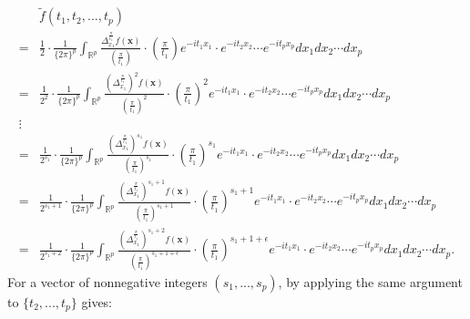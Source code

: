 \documentclass[11pt]{article}
\numberwithin{equation}{section}
\begin{document}
\begin{align*}
	&\widetilde{f}(t_1,t_2,...,t_p)\\
	=&\frac{1}{2}\cdot\frac{1}{\{2\pi\}^{p}}\int_{\mathbb{R}^p}\frac{\Delta_{x_1}^{\frac{\pi}{t_1}}f\left(\boldsymbol{x}\right)}{\left(\frac{\pi}{t_1}\right)}\cdot \left(\frac{\pi}{t_1}\right) e^{-it_1x_1}\cdot e^{-it_2x_2}\cdots e^{-it_px_p}dx_1dx_2\cdots dx_p\\
	=&\frac{1}{2^2}\cdot\frac{1}{\{2\pi\}^{p}}\int_{\mathbb{R}^p}\frac{\left(\Delta_{x_1}^{\frac{\pi}{t_1}}\right)^2f(\boldsymbol{x})}{\left(\frac{\pi}{t_1}\right)^2} \cdot \left(\frac{\pi}{t_1}\right)^2 e^{-it_1x_1}\cdot e^{-it_2x_2}\cdots e^{-it_px_p}dx_1dx_2\cdots dx_p\\
	\vdots &\\
	=&\frac{1}{2^{s_1}}\cdot\frac{1}{\{2\pi\}^{p}}\int_{\mathbb{R}^p}\frac{\left(\Delta_{x_1}^{\frac{\pi}{t_1}}\right)^{s_1}f(\boldsymbol{x})}{\left(\frac{\pi}{t_1}\right)^{s_1}} \cdot \left(\frac{\pi}{t_1}\right)^{s_1} e^{-it_1x_1}\cdot e^{-it_2x_2}\cdots e^{-it_px_p}dx_1dx_2\cdots dx_p\\
		=&\frac{1}{2^{s_1+1}}\cdot\frac{1}{\{2\pi\}^{p}}\int_{\mathbb{R}^p}\frac{\left(\Delta_{x_1}^{\frac{\pi}{t_1}}\right)^{s_1+1}f(\boldsymbol{x})}{\left(\frac{\pi}{t_1}\right)^{s_1+1}} \cdot \left(\frac{\pi}{t_1}\right)^{s_1+1} e^{-it_1x_1}\cdot e^{-it_2x_2}\cdots e^{-it_px_p}dx_1dx_2\cdots dx_p\\
		=&\frac{1}{2^{s_1+2}}\cdot\frac{1}{\{2\pi\}^{p}}\int_{\mathbb{R}^p}\frac{\left(\Delta_{x_1}^{\frac{\pi}{t_1}}\right)^{s_1+2}f(\boldsymbol{x})}{\left(\frac{\pi}{t_1}\right)^{s_1+1+\epsilon}} \cdot \left(\frac{\pi}{t_1}\right)^{s_1+1+\epsilon} e^{-it_1x_1}\cdot e^{-it_2x_2}\cdots e^{-it_px_p}dx_1dx_2\cdots dx_p.
\end{align*}
For a vector of nonnegative integers $(s_1,...,s_p)$, by applying the same argument to $\{t_{2},...,t_p\}$ gives:
\end{document}

